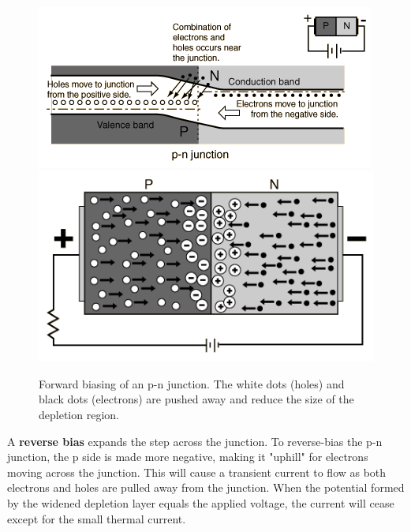 \documentclass[main]{subfiles}
\begin{document}
\begin{figure}[H]
\centering
\includegraphics[scale=0.8]{figs/forward_bias.png}
\includegraphics[scale=0.8]{figs/forward_bias2.png}
\caption{Forward biasing of an p-n junction. The white dots (holes) and black dots (electrons) are pushed away and reduce the size of the depletion region.}
\end{figure}

A \textbf{reverse bias} expands the step across the junction. To reverse-bias the p-n junction, the p side is made more negative, making it "uphill" for electrons moving across the junction. This will cause a transient current to flow as both electrons and holes are pulled away from the junction. When the potential formed by the widened depletion layer equals the applied voltage, the current will cease except for the small thermal current.
\end{document}
